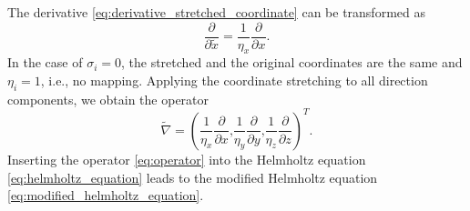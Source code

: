 The derivative \cref{eq:derivative_stretched_coordinate} can be transformed as
\begin{equation}
	\frac{\partial}{\partial \tilde{x}} = \frac{1}{\eta_x}\frac{\partial}{\partial x}\text{.}
\end{equation}
In the case of $\sigma_i = 0$, the stretched and the original coordinates are the same and $\eta_i = 1$, i.e., no mapping. Applying the coordinate stretching to all direction components, we obtain the operator
\begin{equation}
	\tilde{\nabla} = \left(\frac{1}{\eta_x}\frac{\partial}{\partial x}\text{,}\frac{1}{\eta_y}\frac{\partial}{\partial y}\text{,}\frac{1}{\eta_z}\frac{\partial}{\partial z} \right)^T \text{.} \label{eq:operator}
\end{equation}
Inserting the operator \cref{eq:operator} into the Helmholtz equation \cref{eq:helmholtz_equation} leads to the modified Helmholtz equation \cref{eq:modified_helmholtz_equation}.

